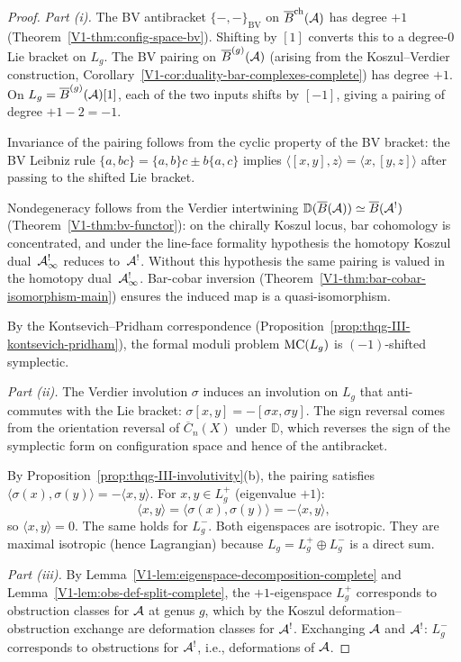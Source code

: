\begin{proof}
\emph{Part (i).}
The BV antibracket $\{-, -\}_{\mathrm{BV}}$ on
$\overline{B}^{\mathrm{ch}}(\mathcal{A})$ has degree $+1$
(Theorem~\ref{V1-thm:config-space-bv}). Shifting by $[1]$
converts this to a degree-$0$ Lie bracket on $L_g$.
The BV pairing on $\overline{B}^{(g)}(\mathcal{A})$ (arising from the
Koszul--Verdier construction,
Corollary~\ref{V1-cor:duality-bar-complexes-complete}) has degree
$+1$. On $L_g = \overline{B}^{(g)}(\mathcal{A})[1]$, each of the two inputs
shifts by $[-1]$, giving a pairing of degree
$+1 - 2 = -1$.

Invariance of the pairing follows from the cyclic property of
the BV bracket: the BV Leibniz rule
$\{a, bc\} = \{a, b\}c \pm b\{a, c\}$ implies
$\langle [x, y], z \rangle = \langle x, [y, z] \rangle$
after passing to the shifted Lie bracket.

Nondegeneracy follows from the Verdier intertwining
$\mathbb{D}(\overline{B}(\mathcal{A})) \simeq \overline{B}(\mathcal{A}^!)$
(Theorem~\ref{V1-thm:bv-functor}): on the chirally Koszul locus,
bar cohomology is concentrated, and under the line-face formality
hypothesis the homotopy Koszul dual~$\mathcal{A}^!_\infty$ reduces to~$\mathcal{A}^!$.
Without this hypothesis the same pairing is valued in the homotopy
dual~$\mathcal{A}^!_\infty$. Bar-cobar inversion
(Theorem~\ref*{V1-thm:bar-cobar-isomorphism-main}) ensures the induced
map is a quasi-isomorphism.

By the Kontsevich--Pridham correspondence
(Proposition~\ref{prop:thqg-III-kontsevich-pridham}),
the formal moduli problem $\mathrm{MC}(L_g)$ is $(-1)$-shifted
symplectic.

\emph{Part (ii).}
The Verdier involution $\sigma$ induces an involution on $L_g$
that anti-commutes with the Lie bracket:
$\sigma[x, y] = -[\sigma x, \sigma y]$.
The sign reversal comes from the orientation reversal of
$\overline{C}_n(X)$ under $\mathbb{D}$, which reverses the
sign of the symplectic form on configuration space and hence
of the antibracket.

By Proposition~\ref{prop:thqg-III-involutivity}(b), the pairing
satisfies $\langle \sigma(x), \sigma(y) \rangle = -\langle x, y
\rangle$. For $x, y \in L_g^+$ (eigenvalue $+1$):
\[
\langle x, y \rangle
= \langle \sigma(x), \sigma(y) \rangle
= -\langle x, y \rangle,
\]
so $\langle x, y \rangle = 0$. The same holds for $L_g^-$.
Both eigenspaces are isotropic. They are maximal isotropic
(hence Lagrangian) because $L_g = L_g^+ \oplus L_g^-$ is a
direct sum.

\emph{Part (iii).}
By Lemma~\ref{V1-lem:eigenspace-decomposition-complete} and
Lemma~\ref{V1-lem:obs-def-split-complete}, the $+1$-eigenspace
$L_g^+$ corresponds to obstruction classes for $\mathcal{A}$ at
genus $g$, which by the Koszul deformation--obstruction exchange
are deformation classes for $\mathcal{A}^!$. Exchanging $\mathcal{A}$ and
$\mathcal{A}^!$: $L_g^-$ corresponds to obstructions for $\mathcal{A}^!$, i.e.,
deformations of $\mathcal{A}$.
\end{proof}

